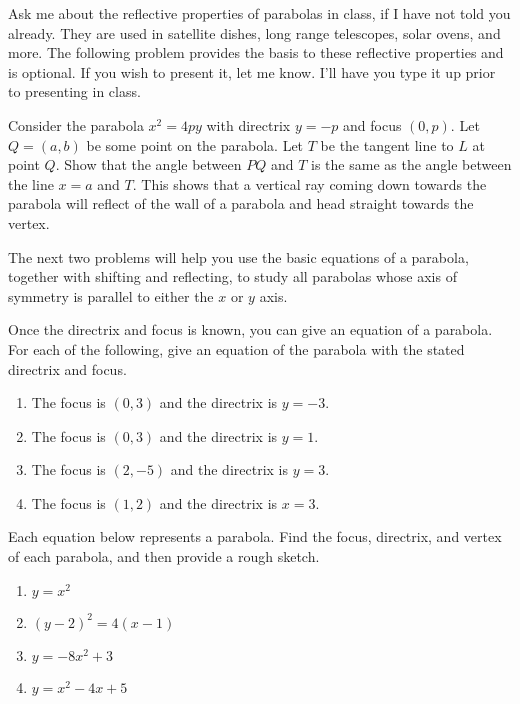 Ask me about the reflective properties of parabolas in class, if I have not told you already.  They are used in satellite dishes, long range telescopes, solar ovens, and more.  The following problem provides the basis to these reflective properties and is optional.  If you wish to present it, let me know. I'll have you type it up prior to presenting in class.

\begin{problem}[Optional]
Consider the parabola $x^2=4py$ with directrix $y=-p$ and focus $(0,p)$. Let $Q=(a,b)$ be some point on the parabola. Let $T$ be the tangent line to $L$ at point $Q$. Show that the angle between $PQ$ and $T$ is the same as the angle between the line $x=a$ and $T$. This shows that a vertical ray coming down towards the parabola will reflect of the wall of a parabola and head straight towards the vertex.    
\end{problem}

The next two problems will help you use the basic equations of a parabola, together with shifting and reflecting, to study all parabolas whose axis of symmetry is parallel to either the $x$ or $y$ axis. 

\begin{problem} 
Once the directrix and focus is known, you can give an equation of a parabola. For each of the following, give an equation of the parabola with the stated directrix and focus.
\begin{enumerate}
\item The focus is $(0,3)$ and the directrix is $y=-3$.
\item The focus is $(0,3)$ and the directrix is $y=1$.
\item The focus is $(2,-5)$ and the directrix is $y=3$.
\item The focus is $(1,2)$ and the directrix is $x=3$.
\end{enumerate}
\end{problem}

\begin{problem}  
Each equation below represents a parabola.  Find the focus, directrix, and vertex of each parabola, and then provide a rough sketch.
\begin{enumerate}
\item $y=x^2$
\item $(y-2)^2=4(x-1)$
\item $y=-8x^2+3$
\item $y=x^2-4x+5$
\end{enumerate}
\end{problem}

